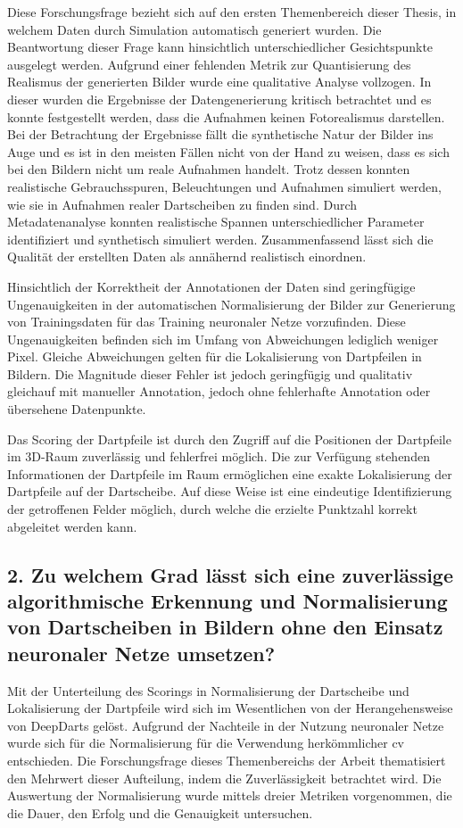 Diese Forschungsfrage bezieht sich auf den ersten Themenbereich dieser Thesis, in welchem Daten durch Simulation automatisch generiert wurden. Die Beantwortung dieser Frage kann hinsichtlich unterschiedlicher Gesichtspunkte ausgelegt werden. Aufgrund einer fehlenden Metrik zur Quantisierung des Realismus der generierten Bilder wurde eine qualitative Analyse vollzogen. In dieser wurden die Ergebnisse der Datengenerierung kritisch betrachtet und es konnte festgestellt werden, dass die Aufnahmen keinen Fotorealismus darstellen. Bei der Betrachtung der Ergebnisse fällt die synthetische Natur der Bilder ins Auge und es ist in den meisten Fällen nicht von der Hand zu weisen, dass es sich bei den Bildern nicht um reale Aufnahmen handelt. Trotz dessen konnten realistische Gebrauchsspuren, Beleuchtungen und Aufnahmen simuliert werden, wie sie in Aufnahmen realer Dartscheiben zu finden sind. Durch Metadatenanalyse konnten realistische Spannen unterschiedlicher Parameter identifiziert und synthetisch simuliert werden. Zusammenfassend lässt sich die Qualität der erstellten Daten als annähernd realistisch einordnen.

Hinsichtlich der Korrektheit der Annotationen der Daten sind geringfügige Ungenauigkeiten in der automatischen Normalisierung der Bilder zur Generierung von Trainingsdaten für das Training neuronaler Netze vorzufinden. Diese Ungenauigkeiten befinden sich im Umfang von Abweichungen lediglich weniger Pixel. Gleiche Abweichungen gelten für die Lokalisierung von Dartpfeilen in Bildern. Die Magnitude dieser Fehler ist jedoch geringfügig und qualitativ gleichauf mit manueller Annotation, jedoch ohne fehlerhafte Annotation oder übersehene Datenpunkte.

Das Scoring der Dartpfeile ist durch den Zugriff auf die Positionen der Dartpfeile im 3D-Raum zuverlässig und fehlerfrei möglich. Die zur Verfügung stehenden Informationen der Dartpfeile im Raum ermöglichen eine exakte Lokalisierung der Dartpfeile auf der Dartscheibe. Auf diese Weise ist eine eindeutige Identifizierung der getroffenen Felder möglich, durch welche die erzielte Punktzahl korrekt abgeleitet werden kann.

\subsection*{2. Zu welchem Grad lässt sich eine zuverlässige algorithmische Erkennung und Normalisierung von Dartscheiben in Bildern ohne den Einsatz neuronaler Netze umsetzen?}

Mit der Unterteilung des Scorings in Normalisierung der Dartscheibe und Lokalisierung der Dartpfeile wird sich im Wesentlichen von der Herangehensweise von DeepDarts gelöst. Aufgrund der Nachteile in der Nutzung neuronaler Netze wurde sich für die Normalisierung für die Verwendung herkömmlicher \ac{cv} entschieden. Die Forschungsfrage dieses Themenbereichs der Arbeit thematisiert den Mehrwert dieser Aufteilung, indem die Zuverlässigkeit betrachtet wird. Die Auswertung der Normalisierung wurde mittels dreier Metriken vorgenommen, die die Dauer, den Erfolg und die Genauigkeit untersuchen.


